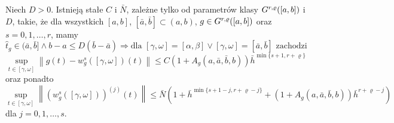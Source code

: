 \documentclass[oik, pdftex, robocza, man]{mgrwms}
\begin{document}
    \begin{stw} \label{2014_stw2}
        Niech $D > 0$. Istnieją stałe $C$ i $\bar{N}$, zależne tylko od parametrów klasy $G^{r,\varrho}([a,b])$ i $D$, takie, że dla wszystkich $[a,b]$, $[\bar{a}, \bar{b}] \subset (a,b)$, $g \in G^{r,\varrho}([a,b])$ oraz $s=0,1,\dots,r$, mamy
        \begin{equation*}
            \hat{t}_{g} \in (\bar{a}, \bar{b}] \land b-a \leq D(\bar{b}-\bar{a}) \Longrightarrow \text{dla } [\gamma, \omega]=[\alpha, \beta] \vee [\gamma, \omega]=[\bar{a}, \bar{b}] \text{ zachodzi }
        \end{equation*}
        \begin{equation} \label{eq:19}
            \sup _{t \in[\gamma, \omega]}\left\|g(t)-w_{g}^{s}([\gamma, \omega])(t)\right\| \leq C\left(1+A_{g}(a, \bar{a}, \bar{b}, b)\right) \bar{h}^{\min \{s+1, r+\varrho\}}
        \end{equation}
        oraz ponadto
        \begin{equation*} \label{eq:20}
            \sup _{t \in[\gamma, \omega]}\left\|\left(w_{g}^{s}([\gamma, \omega])\right)^{(j)}(t)\right\| \leq \bar{N}\left(1+\bar{h}^{\min \{s+1-j, r+\varrho-j\}}+\left(1+A_{g}(a, \bar{a}, \bar{b}, b)\right) \bar{h}^{r+\varrho-j}\right)
        \end{equation*}
        dla $j=0,1,\dots,s$.
    \end{stw}
\end{document}
